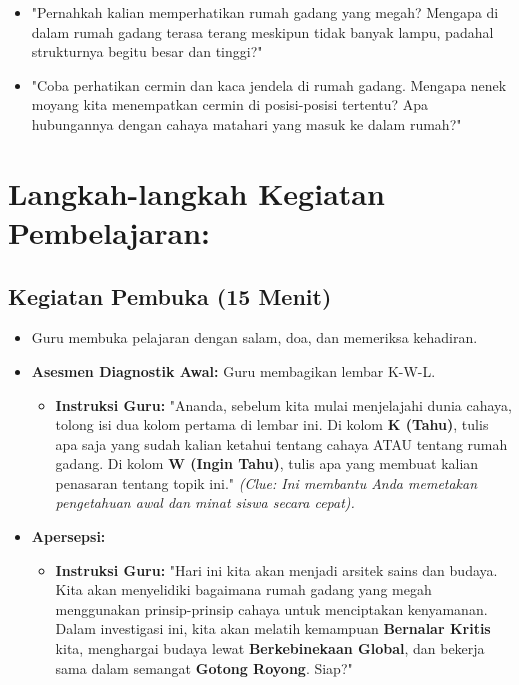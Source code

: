 \documentclass[12pt,a4paper]{article}
\begin{document}
\begin{itemize}
\item "Pernahkah kalian memperhatikan rumah gadang yang megah? Mengapa di dalam rumah gadang terasa terang meskipun tidak banyak lampu, padahal strukturnya begitu besar dan tinggi?"
\item "Coba perhatikan cermin dan kaca jendela di rumah gadang. Mengapa nenek moyang kita menempatkan cermin di posisi-posisi tertentu? Apa hubungannya dengan cahaya matahari yang masuk ke dalam rumah?"
\end{itemize}

\section{Langkah-langkah Kegiatan Pembelajaran:}

\subsection{Kegiatan Pembuka (15 Menit)}
\begin{itemize}
\item Guru membuka pelajaran dengan salam, doa, dan memeriksa kehadiran.
\item \textbf{Asesmen Diagnostik Awal:} Guru membagikan lembar K-W-L.
    \begin{itemize}
    \item \textbf{Instruksi Guru:} "Ananda, sebelum kita mulai menjelajahi dunia cahaya, tolong isi dua kolom pertama di lembar ini. Di kolom \textbf{K (Tahu)}, tulis apa saja yang sudah kalian ketahui tentang cahaya ATAU tentang rumah gadang. Di kolom \textbf{W (Ingin Tahu)}, tulis apa yang membuat kalian penasaran tentang topik ini." \textit{(Clue: Ini membantu Anda memetakan pengetahuan awal dan minat siswa secara cepat).}
    \end{itemize}
\item \textbf{Apersepsi:}
    \begin{itemize}
    \item \textbf{Instruksi Guru:} "Hari ini kita akan menjadi arsitek sains dan budaya. Kita akan menyelidiki bagaimana rumah gadang yang megah menggunakan prinsip-prinsip cahaya untuk menciptakan kenyamanan. Dalam investigasi ini, kita akan melatih kemampuan \textbf{Bernalar Kritis} kita, menghargai budaya lewat \textbf{Berkebinekaan Global}, dan bekerja sama dalam semangat \textbf{Gotong Royong}. Siap?"
    \end{itemize}
\end{itemize}
\end{document}
